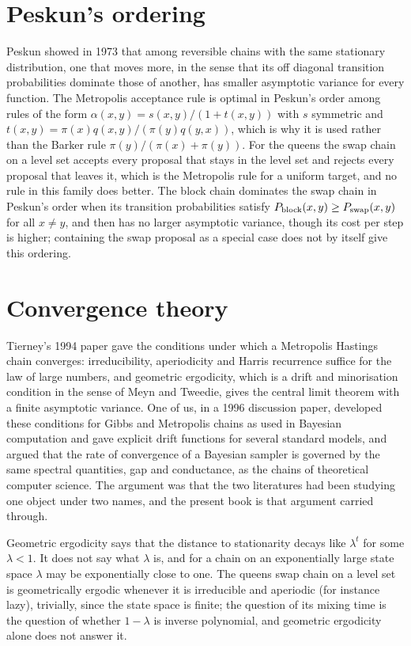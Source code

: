 \section{Peskun's ordering}

Peskun showed in 1973 that among reversible chains with the same stationary distribution, one that moves more, in the sense that its off diagonal transition probabilities dominate those of another, has smaller asymptotic variance for every function. The Metropolis acceptance rule is optimal in Peskun's order among rules of the form $\alpha(x, y) = s(x, y) / (1 + t(x, y))$ with $s$ symmetric and $t(x, y) = \pi(x) q(x, y) / (\pi(y) q(y, x))$, which is why it is used rather than the Barker rule $\pi(y) / (\pi(x) + \pi(y))$. For the queens the swap chain on a level set accepts every proposal that stays in the level set and rejects every proposal that leaves it, which is the Metropolis rule for a uniform target, and no rule in this family does better. The block chain dominates the swap chain in Peskun's order when its transition probabilities satisfy $P_{\rm block}(x, y) \ge P_{\rm swap}(x, y)$ for all $x \ne y$, and then has no larger asymptotic variance, though its cost per step is higher; containing the swap proposal as a special case does not by itself give this ordering.

\section{Convergence theory}

Tierney's 1994 paper gave the conditions under which a Metropolis Hastings chain converges: irreducibility, aperiodicity and Harris recurrence suffice for the law of large numbers, and geometric ergodicity, which is a drift and minorisation condition in the sense of Meyn and Tweedie, gives the central limit theorem with a finite asymptotic variance. One of us, in a 1996 discussion paper, developed these conditions for Gibbs and Metropolis chains as used in Bayesian computation and gave explicit drift functions for several standard models, and argued that the rate of convergence of a Bayesian sampler is governed by the same spectral quantities, gap and conductance, as the chains of theoretical computer science. The argument was that the two literatures had been studying one object under two names, and the present book is that argument carried through.

Geometric ergodicity says that the distance to stationarity decays like $\lambda^t$ for some $\lambda < 1$. It does not say what $\lambda$ is, and for a chain on an exponentially large state space $\lambda$ may be exponentially close to one. The queens swap chain on a level set is geometrically ergodic whenever it is irreducible and aperiodic (for instance lazy), trivially, since the state space is finite; the question of its mixing time is the question of whether $1 - \lambda$ is inverse polynomial, and geometric ergodicity alone does not answer it.

